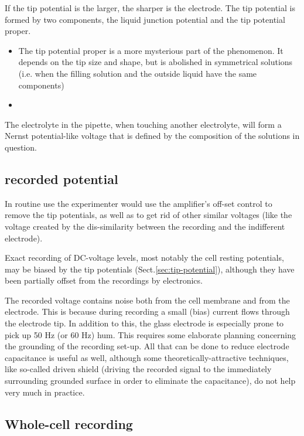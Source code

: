 If the tip potential is the larger, the sharper is the electrode.
The tip potential is formed by two components, the liquid junction potential and
the tip potential proper.
\begin{itemize}
  \item  The tip potential proper is a more mysterious part of the phenomenon.
  It depends on the tip size and shape, but is abolished in symmetrical
  solutions (i.e. when the filling solution and the outside liquid have the same
  components)

  \item
\end{itemize}


 The electrolyte in the pipette, when touching another electrolyte, will form a
Nernst potential-like voltage that is defined by the composition of the
solutions in question.






\subsection{recorded potential}

In routine use the experimenter would use the amplifier's off-set
control to remove the tip potentials, as well as to get rid of other similar
voltages (like the voltage created by the dis-similarity between the recording
and the indifferent electrode).

Exact recording of DC-voltage levels, most notably the cell resting potentials,
may be biased by the tip potentials (Sect.\ref{sec:tip-potential}), although
they have been partially offset from the recordings by electronics.

The recorded voltage contains noise both from the cell membrane and from the
electrode. This is because during recording a small (bias) current flows through
the electrode tip. In addition to this, the glass electrode is especially prone
to pick up 50 Hz (or 60 Hz) hum. This requires some elaborate planning
concerning the grounding of the recording set-up. All that can be done to reduce
electrode capacitance is useful as well, although some theoretically-attractive
techniques, like so-called driven shield (driving the recorded signal to the
immediately surrounding grounded surface in order to eliminate the capacitance),
do not help very much in practice.

\subsection{Whole-cell recording}

